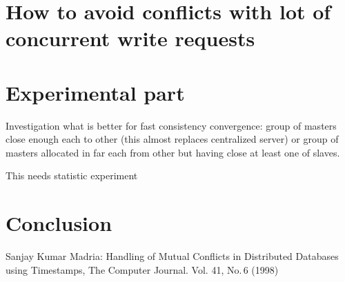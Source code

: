 \documentclass{llncs}
\begin{document}
\section{How to avoid conflicts with lot of concurrent write requests}
\section{Experimental part}\label{sec:experiments}
Investigation what is better for fast consistency convergence:
group of masters close enough each to other (this almost replaces centralized server)
or group of masters allocated in far each from other but having close at least one of slaves.

This needs statistic experiment

\section{Conclusion}

\begin{thebibliography}{99}

Sanjay Kumar Madria: 
Handling of Mutual Conflicts in Distributed Databases using Timestamps,
The Computer Journal. Vol. 41, No.\,6 (1998) 

\end{thebibliography}
\end{document}
